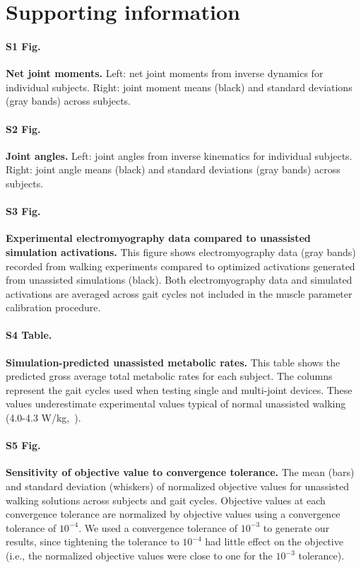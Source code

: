 \documentclass[10pt,letterpaper]{article}
\begin{document}
\section*{Supporting information}

\paragraph*{S1 Fig.}
\label{S1_Fig}
{\bf Net joint moments.} Left: net joint moments from inverse dynamics for individual subjects. Right: joint moment means (black) and standard deviations (gray bands) across subjects.

\paragraph*{S2 Fig.}
\label{S2_Fig}
{\bf Joint angles.} Left: joint angles from inverse kinematics for individual subjects. Right: joint angle means (black) and standard deviations (gray bands) across subjects.

\paragraph*{S3 Fig.}
\label{S3_Fig}
{\bf Experimental electromyography data compared to unassisted simulation activations.} This figure shows electromyography data (gray bands) recorded from walking experiments compared to optimized activations generated from unassisted simulations (black). Both electromyography data and simulated activations are averaged across gait cycles not included in the muscle parameter calibration procedure.

\paragraph*{S4 Table.}
\label{S4_Table}
{\bf Simulation-predicted unassisted metabolic rates.} This table shows the predicted gross average total metabolic rates for each subject. The columns represent the gait cycles used when testing single and multi-joint devices. These values underestimate experimental values typical of normal unassisted walking (4.0-4.3 W/kg,~\cite{Waters:1999}).

\paragraph*{S5 Fig.}
\label{S5_Fig}
{\bf Sensitivity of objective value to convergence tolerance.} The mean (bars) and standard deviation (whiskers) of normalized objective values for unassisted walking solutions across subjects and gait cycles. Objective values at each convergence tolerance are normalized by objective values using a convergence tolerance of $10^{-4}$. We used a convergence tolerance of $10^{-3}$ to generate our results, since tightening the tolerance to $10^{-4}$ had little effect on the objective (i.e., the normalized objective values were close to one for the $10^{-3}$ tolerance).
\end{document}

